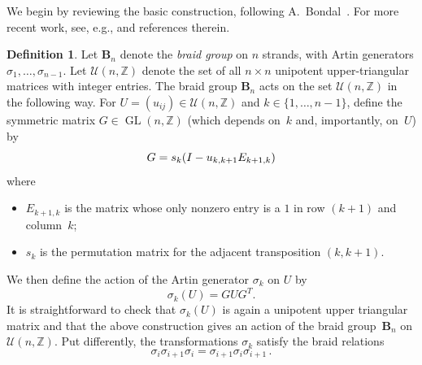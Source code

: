 \documentclass[11pt, letterpaper]{amsart}
\theoremstyle{definition}
\newtheorem{definition}[theorem]{Definition}
\numberwithin{equation}{section}
\def\ZZ{{\mathbb Z}}
\def\GL{{\operatorname{GL}}}
\begin{document}
\medskip

We begin by reviewing the basic construction, following A.~Bondal~\cite[Section~2]{Bondal}. 
For more recent work, see, e.g., \cite{FW} and references therein. 

\begin{definition}
\label{def:Bn-action}
Let $\mathbf{B}_n$ denote the \emph{braid group} on $n$ strands, with Artin generators
$\sigma_1, \ldots, \sigma_{n-1}$. 
Let $\mathcal{U}(n,\ZZ)$ denote the set of all $n\times n$ unipotent upper-triangular matrices 
with integer entries. 
The braid group $\mathbf{B}_n$ acts on the set $\mathcal{U}(n,\ZZ)$ in the following way. \linebreak[3]
For $U=(u_{ij})\in\mathcal{U}(n,\ZZ)$ and $k\in\{1,\dots,n-1\}$, 
define the symmetric matrix $G\in\GL(n,\ZZ)$ (which depends on~$k$ and, importantly, on~$U$) by
\vspace{-1pt}
\begin{equation}
\label{eq:G-sigma}
G=s_k (I - u_{k,k+1} E_{k+1,k}) 
\vspace{-1pt}
\end{equation}
where 
\vspace{-1pt}
\begin{itemize}[leftmargin=.2in]
\item 
$E_{k+1,k}$ is the matrix whose only nonzero entry is a $1$ in row $(k+1)$ and column~$k$; 
\item
$s_k$ is the permutation matrix for the adjacent transposition $(k,k+1)$.
\end{itemize}
We then define the action of the Artin generator $\sigma_k$ on $U$ by 
\vspace{-1pt}
\begin{equation}
\label{eq:sigma_i(U)}
\sigma_k(U) = G  U G^T. 
\end{equation}
It is straightforward to check that $\sigma_k(U)$ is again a unipotent upper triangular matrix
and that the above construction gives an action of the braid group~$\mathbf{B}_n$ on $\mathcal{U}(n,\ZZ)$. 
Put differently, the transformations $\sigma_k$ satisfy the braid relations 
\begin{equation*}
\sigma_i \sigma_{i+1} \sigma_i = \sigma_{i+1} \sigma_i \sigma_{i+1}\,. 
\end{equation*}
\end{definition}
\end{document}

